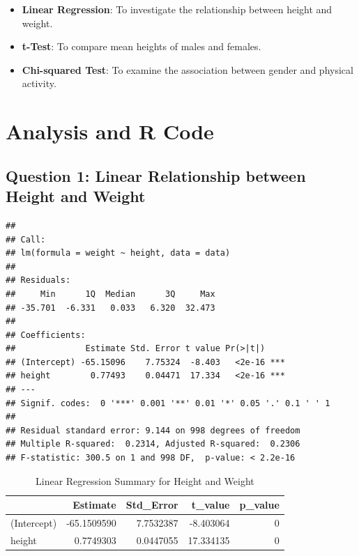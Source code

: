 \documentclass[
]{article}
\providecommand{\tightlist}{%
  \setlength{\itemsep}{0pt}\setlength{\parskip}{0pt}}
\begin{document}
\begin{itemize}
\tightlist
\item
  \textbf{Linear Regression}: To investigate the relationship between
  height and weight.
\item
  \textbf{t-Test}: To compare mean heights of males and females.
\item
  \textbf{Chi-squared Test}: To examine the association between gender
  and physical activity.
\end{itemize}

\section{Analysis and R Code}\label{analysis-and-r-code}

\subsection{Question 1: Linear Relationship between Height and
Weight}\label{question-1-linear-relationship-between-height-and-weight}

\begin{verbatim}
## 
## Call:
## lm(formula = weight ~ height, data = data)
## 
## Residuals:
##     Min      1Q  Median      3Q     Max 
## -35.701  -6.331   0.033   6.320  32.473 
## 
## Coefficients:
##              Estimate Std. Error t value Pr(>|t|)    
## (Intercept) -65.15096    7.75324  -8.403   <2e-16 ***
## height        0.77493    0.04471  17.334   <2e-16 ***
## ---
## Signif. codes:  0 '***' 0.001 '**' 0.01 '*' 0.05 '.' 0.1 ' ' 1
## 
## Residual standard error: 9.144 on 998 degrees of freedom
## Multiple R-squared:  0.2314, Adjusted R-squared:  0.2306 
## F-statistic: 300.5 on 1 and 998 DF,  p-value: < 2.2e-16
\end{verbatim}

\begin{table}
\centering
\caption{\label{tab:linear-model}Linear Regression Summary for Height and Weight}
\centering
\begin{tabular}[t]{lrrrr}
\toprule
  & Estimate & Std\_Error & t\_value & p\_value\\
\midrule
(Intercept) & -65.1509590 & 7.7532387 & -8.403064 & 0\\
height & 0.7749303 & 0.0447055 & 17.334135 & 0\\
\bottomrule
\end{tabular}
\end{table}
\end{document}
